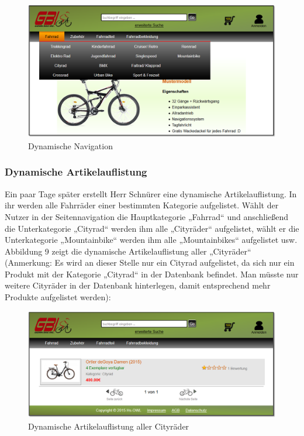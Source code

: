 \begin{figure}[H]
\begin{center}
\includegraphics[width=150mm]{Bilder/Abbildung9-DynamischeNaviagtionDesWebshops.png}
\end{center}
\caption{Dynamische Navigation}
\label{Abbildung9-Dynamische Navigation}
\end{figure}


\subsubsection{Dynamische Artikelauflistung}

Ein paar Tage später erstellt Herr Schnürer eine dynamische Artikelauflistung. In ihr werden alle Fahrräder einer bestimmten Kategorie aufgelistet. Wählt der Nutzer in der Seitennavigation die Hauptkategorie „Fahrrad“ und anschließend die Unterkategorie „Cityrad“ werden ihm alle „Cityräder“ aufgelistet, wählt er die Unterkategorie „Mountainbike“ werden ihm alle „Mountainbikes“ aufgelistet usw. Abbildung 9 zeigt die dynamische Artikelauflistung aller „Cityräder“ (Anmerkung: Es wird an dieser Stelle nur ein Cityrad aufgelistet, da sich nur ein Produkt mit der Kategorie „Cityrad“ in der Datenbank befindet. Man müsste nur weitere Cityräder in der Datenbank hinterlegen, damit entsprechend mehr Produkte aufgelistet werden):

\begin{figure}[H]
\begin{center}
\includegraphics[width=150mm]{Bilder/Abbildung10-DynamischeArtikelauflistungAllerCitybikes.png}
\end{center}
\caption{Dynamische Artikelauflistung aller Cityräder}
\label{Abbildung10-Dynamische Artikelauflistung aller Cityräder}
\end{figure}


